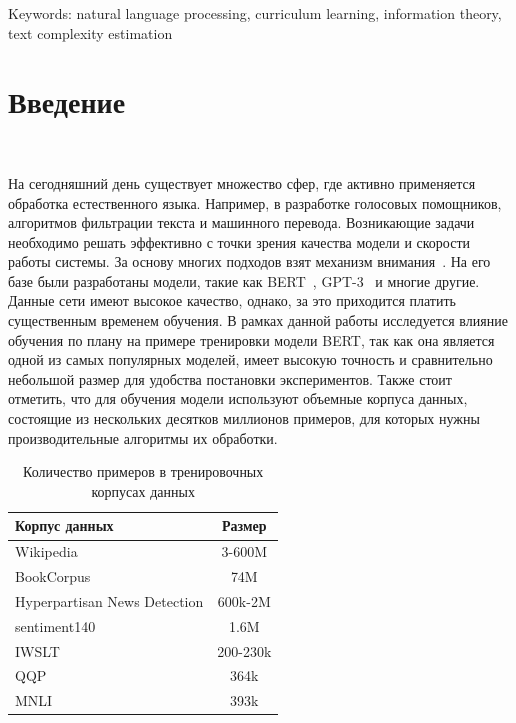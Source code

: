 \documentclass{spbau-diploma}
\begin{document}
Keywords: natural language processing, curriculum learning, information theory, text complexity estimation
\section*{Введение}
\ 

На сегодняшний день существует множество сфер, где активно применяется обработка естественного языка. Например, в разработке голосовых помощников, алгоритмов фильтрации текста и машинного перевода. Возникающие задачи необходимо решать эффективно с точки зрения качества модели и скорости работы системы. За основу многих подходов взят механизм внимания~\cite{vaswani2017attention}. На его базе были разработаны модели, такие как BERT~\cite{devlin2018bert}, GPT-3~\cite{brown2020language} и многие другие. Данные сети имеют высокое качество, однако, за это приходится платить существенным временем обучения. В рамках данной работы исследуется влияние обучения по плану на примере тренировки модели BERT, так как она является одной из самых популярных моделей, имеет высокую точность и сравнительно небольшой размер для удобства постановки экспериментов. Также стоит отметить, что для обучения модели используют объемные корпуса данных, состоящие из нескольких десятков миллионов примеров, для которых нужны производительные алгоритмы их обработки. 

\begin{table}[h]
	\label{table:dataset_sizes}
	\caption{Количество примеров в тренировочных корпусах данных}
	\centering
	\begin{tabular}{|l|c|}
		\hline
		Корпус данных & Размер \\
		\hline\hline
		Wikipedia & 3-600M \\
		BookCorpus & 74M\\
		\hline\hline
		Hyperpartisan News Detection & 600k-2M \\
		sentiment140 & 1.6M \\
		IWSLT & 200-230k \\
		QQP & 364k \\
		MNLI & 393k \\
		\hline
	\end{tabular}
\end{table}
\end{document}

